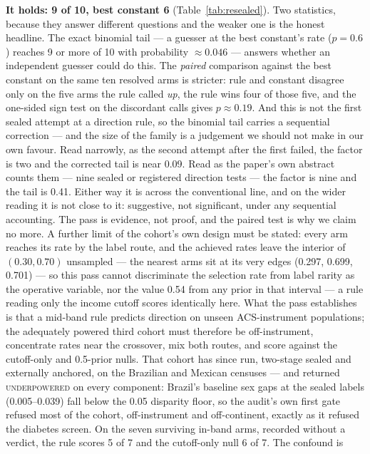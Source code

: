 \documentclass[9pt,conference]{IEEEtran}
\begin{document}
\textbf{It holds: 9 of 10, best constant 6} (Table~\ref{tab:resealed}). Two statistics,
because they answer different questions and the weaker one is the honest headline. The
exact binomial tail --- a guesser at the best constant's rate ($p = 0.6$) reaches 9 or
more of 10 with probability $\approx 0.046$ --- answers whether an independent guesser
could do this. The \emph{paired} comparison against the best constant on the same ten
resolved arms is stricter: rule and constant disagree only on the five arms the rule
called \emph{up}, the rule wins four of those five, and the one-sided sign test on the
discordant calls gives $p \approx 0.19$. And this is not the first sealed attempt at a direction rule, so the binomial tail carries a
sequential correction --- and the size of the family is a judgement we should not make in our
own favour. Read narrowly, as the second attempt after the first failed, the factor is two and
the corrected tail is near 0.09. Read as the paper's own abstract counts them --- nine sealed
or registered direction tests --- the factor is nine and the tail is 0.41. Either way it is
across the conventional line, and on the wider reading it is not close to it: suggestive, not
significant, under any sequential accounting. The
pass is evidence, not proof, and the paired test is why we claim no more. A further limit of
the cohort's own design must be stated: every arm reaches its rate by the label route, and
the achieved rates leave the interior of $(0.30, 0.70)$ unsampled --- the nearest arms
sit at its very edges (0.297, 0.699, 0.701) --- so this pass cannot discriminate the
selection rate from label rarity as the operative variable, nor the value 0.54 from any
prior in that interval --- a rule reading only the income cutoff scores identically here.
What the pass establishes is that a mid-band rule predicts direction on unseen
ACS-instrument populations; the adequately powered third cohort must therefore be
off-instrument, concentrate rates near the crossover, mix both routes, and score against
the cutoff-only and 0.5-prior nulls. That cohort has since run, two-stage sealed and
externally anchored, on the Brazilian and Mexican censuses --- and returned
\textsc{underpowered} on every component: Brazil's baseline sex gaps at the sealed
labels (0.005--0.039) fall below the 0.05 disparity floor, so the audit's own first
gate refused most of the cohort, off-instrument and off-continent, exactly as it
refused the diabetes screen. On the seven surviving in-band arms, recorded without a
verdict, the rule scores 5 of 7 and the cutoff-only null 6 of 7. The confound is
\end{document}
